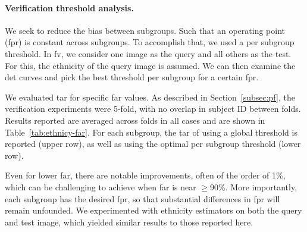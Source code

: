 \noindent\paragraph{Verification threshold analysis.}%
We seek to reduce the bias between subgroups. Such that an operating point (\ie \gls{fpr}) is constant across subgroups. To accomplish that, we used a per subgroup threshold. In \gls{fv}, we consider one image as the query and all others as the test. For this, the ethnicity of the query image is assumed. We can then examine the \gls{det} curves and pick the best threshold per subgroup for a certain \gls{fpr}.

We evaluated \gls{tar} for specific \gls{far} values. As described in Section~\ref{subsec:pf}, the verification experiments were 5-fold, with no overlap in subject ID between folds. Results reported are averaged across folds in all cases and are shown in Table~\ref{tab:ethnicy-far}. For each subgroup, the \gls{tar} of using a global threshold is reported (upper row), as well as using the optimal per subgroup threshold (lower row). 

Even for lower \gls{far}, there are notable improvements, often of the order of 1\%, which can be challenging to achieve when \gls{far} is near $\geq$90\%. More importantly, each subgroup has the desired \gls{fpr}, so that substantial differences in \gls{fpr} will remain unfounded. We experimented with ethnicity estimators on both the query and test image, which yielded similar results to those reported here.

